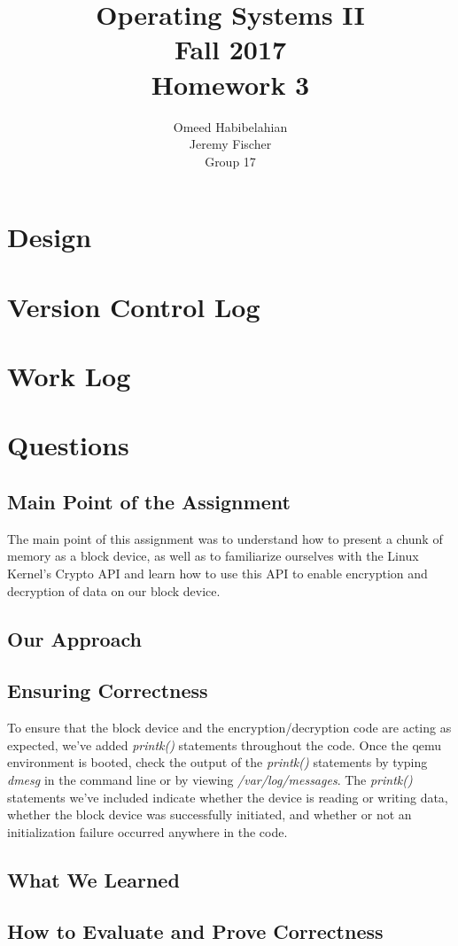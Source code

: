 \documentclass[draftclsnofoot, onecolumn, 10pt, compsoc]{IEEEtran}
\title{\textbf{Operating Systems II}\\Fall 2017\\Homework 3}
\author{Omeed Habibelahian\\Jeremy Fischer\\Group 17}
\begin{document}
	\maketitle
	\newpage
	
	\section{Design}
	\section{Version Control Log}
	\section{Work Log}
	\section{Questions}
		\subsection{Main Point of the Assignment}
			The main point of this assignment was to understand how to present a chunk of memory as a block device, as well as to familiarize ourselves with the Linux Kernel's Crypto API and learn how to use this API to enable encryption and decryption of data on our block device.
		\subsection{Our Approach}
		\subsection{Ensuring Correctness}
			To ensure that the block device and the encryption/decryption code are acting as expected, we've added \textit{printk()} statements throughout the code. Once the qemu environment is booted, check the output of the \textit{printk()} statements by typing \textit{dmesg} in the command line or by viewing \textit{/var/log/messages}. The \textit{printk()} statements we've included indicate whether the device is reading or writing data, whether the block device was successfully initiated, and whether or not an initialization failure occurred anywhere in the code.
		\subsection{What We Learned}
		\subsection{How to Evaluate and Prove Correctness}
	
\end{document}
